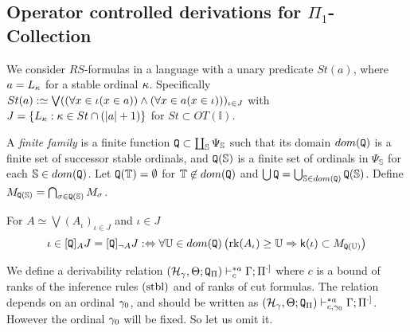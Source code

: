 \documentclass{article}
\newcommand{\mS}{\mathbb{S}}
\newcommand{\mI}{\mathbb{I}}
\newcommand{\mT}{\mathbb{T}}
\newcommand{\mU}{\mathbb{U}}
\begin{document}
\subsection{Operator controlled derivations for $\Pi_{1}$-Collection}\label{subsec:operatorcont}
We consider $RS$-formulas in a language with a unary predicate $St(a)$, where
$a=L_{\kappa}$ for a stable ordinal $\kappa$.
Specifically
$St(a):\simeq \bigvee( (\forall x\in \iota(x\in a))\land (\forall x\in a(x\in \iota)))_{\iota\in J}$ 
with $J=\{L_{\kappa}: \kappa\in St\cap(|a|+1)\}$ for
$St\subset OT(\mI)$.



\bdf\label{df:QJ}
{\rm
A \textit{finite family} 
is a finite function ${\tt Q}\subset\coprod_{\mS}\Psi_{\mS}$ such that
its domain $dom({\tt Q})$ is a finite set of successor stable ordinals,
and ${\tt Q}(\mS)$ is a finite set of ordinals in $\Psi_{\mS}$ for each $\mS\in dom({\tt Q})$.
Let
${\tt Q}(\mT)=\emptyset$ for $\mT\not\in dom({\tt Q})$ and
$\bigcup{\tt Q}=\bigcup_{\mS\in dom({\tt Q})}{\tt Q}(\mS)$.
Define
$M_{{\tt Q}(\mS)}=\bigcap_{\sig\in{\tt Q}(\mS)} M_{\sig}$.

For $A\simeq\bigvee(A_{\iota})_{\iota\in J}$ and $\iota\in J$
\[
\iota\in [{\tt Q}]_{A}J = [{\tt Q}]_{\lnot A}J   :\Lrarw
\fal\mU\in dom({\tt Q})
\left(
\rk(A_{\iota})\geq\mU \Rarw \sfk(\iota)\subset M_{{\tt Q}(\mU)}
\right)
\]
}
\edf




We define a derivability relation 
$(\mathcal{H}_{\gamma},\Theta;{\tt Q}_{\Pi})\vdash^{* a}_{c}\Gamma;\Pi^{\cdot]}$
where 
$c$ is a bound of ranks of the inference rules $({\rm stbl})$ and of ranks of cut formulas.
The relation depends on an ordinal $\gamma_{0}$, and
should be written as $(\mathcal{H}_{\gamma},\Theta;{\tt Q}_{\Pi})\vdash^{*a}_{c,\gamma_{0}} \Gamma;\Pi^{\cdot]}$.
However the ordinal $\gamma_{0}$ will be fixed.
So let us omit it.
\end{document}
